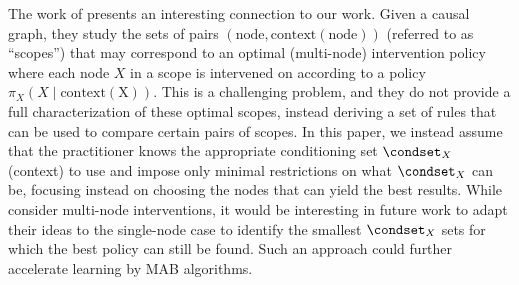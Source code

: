 The work of  presents an interesting connection to our work.
Given a causal graph, they study the sets of pairs $(\mathrm{node}, \mathrm{context(node)})$ (referred to as ``scopes'') that may correspond to an optimal (multi-node) intervention policy where each node $X$ in a scope is intervened on according to a policy $\pi_{X}(X \mid \mathrm{context(X)})$.
This is a challenging problem, and they do not provide a full characterization of these optimal scopes, instead deriving a set of rules that can be used to compare certain pairs of scopes.
In this paper, we instead assume that the practitioner knows the appropriate conditioning set $\condset_{X}$ (context) to use and impose only minimal restrictions on what $\condset_{X}$ can be, focusing instead on choosing the nodes that can yield the best results.
While \citet{lee2020characterizing} consider multi-node interventions, it would be interesting in future work to adapt their ideas to the single-node case to identify the smallest $\condset_{X}$ sets for which the best policy can still be found.
Such an approach
could further accelerate learning by MAB algorithms.